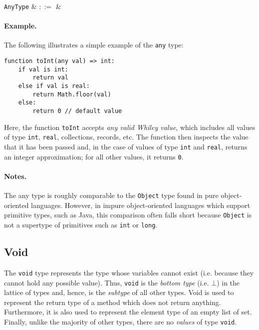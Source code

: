 \begin{syntax}
  \verb+AnyType+ & $::=$ &  \\
\end{syntax}

\paragraph{Example.} The following illustrates a simple example of the \lstinline{any} type:

\begin{lstlisting}
function toInt(any val) => int:
    if val is int:
        return val
    else if val is real:
        return Math.floor(val)
    else:
        return 0 // default value        
\end{lstlisting}

Here, the function \lstinline{toInt} accepts {\em any valid Whiley value}, which includes all values of type \lstinline{int}, \lstinline{real}, collections, records, etc.  The function then inspects the value that it has been passed and, in the case of values of type \lstinline{int} and \lstinline{real}, returns an integer approximation; for all other values, it returns \lstinline{0}.

\paragraph{Notes.}  The any type is roughly comparable to the \lstinline{Object} type found in pure object-oriented languages.  However, in impure object-oriented languages which support primitive types, such as Java, this comparison often falls short because \lstinline{Object} is not a supertype of primitives such as \lstinline{int} or \lstinline{long}.


\subsection{Void}
\label{c_types_void}

The \lstinline{void} type represents the type whose variables cannot exist (i.e. because they cannot hold any possible value).  Thus, \lstinline{void} is the {\em bottom type} (i.e. $\bot$) in the lattice of types and, hence, is the {\em subtype} of all other types.  Void is used to represent the return type of a method which does not return anything.  Furthermore, it is also used to represent the element type of an empty list of set.  Finally, unlike the majority of other types, there are no {\em values} of type \lstinline{void}.

